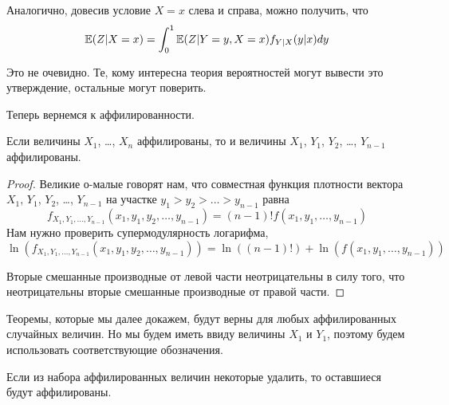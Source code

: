 
Аналогично, довесив условие $X=x$ слева и справа, можно получить, что
\begin{equation}
\label{iterated_e}
\operatorname{\mathbb{E}}(Z|X=x)=\int_{0}^{1}\operatorname{\mathbb{E}}(Z|Y=y, X=x)f_{Y|X}(y|x)dy
\end{equation}

Это не очевидно. Те, кому интересна теория вероятностей могут вывести это утверждение, остальные могут поверить.

Теперь вернемся к аффилированности.

\begin{myth}
\label{aff_order}
Если величины $ X_{1} $, \ldots, $ X_{n} $ аффилированы, то и величины $ X_{1} $, $ Y_{1} $, $ Y_{2} $, \ldots, $ Y_{n-1} $ аффилированы. 
\end{myth}

\begin{proof}
Великие о-малые говорят нам, что совместная функция плотности вектора $ X_{1} $, $ Y_{1} $, $ Y_{2} $, \ldots, $ Y_{n-1} $ на участке $ y_{1}>y_{2}>\ldots>y_{n-1} $ равна
\begin{equation}
f_{X_{1},Y_{1},\ldots,Y_{n-1}}(x_{1},y_{1},y_{2},\ldots,y_{n-1})=(n-1)!f(x_{1},y_{1},\ldots,y_{n-1})
\end{equation}
Нам нужно проверить супермодулярность логарифма,
\begin{equation}
\ln(f_{X_{1},Y_{1},\ldots,Y_{n-1}}(x_{1},y_{1},y_{2},\ldots,y_{n-1}))=\ln((n-1)!)+\ln(f(x_{1},y_{1},\ldots,y_{n-1}))
\end{equation}

Вторые смешанные производные от левой части неотрицательны в силу того, что неотрицательны вторые смешанные производные от правой части.

\end{proof}



Теоремы, которые мы далее докажем, будут верны для любых аффилированных случайных величин. Но мы будем иметь ввиду величины $ X_{1} $ и $ Y_{1} $, поэтому будем использовать соответствующие обозначения.

\begin{myth}
\label{aff_delete}
Если из набора аффилированных величин некоторые удалить, то оставшиеся будут аффилированы.
\end{myth}


